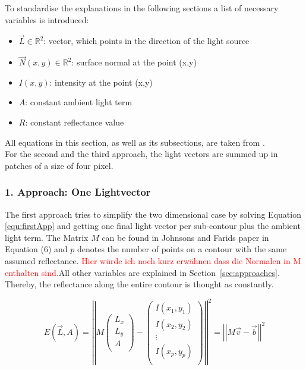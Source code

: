 To standardise the explanations in the following sections a list of necessary variables is introduced: 
\begin{itemize}
\item $\vec{L} \in \mathbb{R}^2$: vector, which points in the direction of the light source 
\item $\vec{N}(x,y)\in \mathbb{R}^2$: surface normal at the point (x,y) 
\item $I(x,y)$: intensity at the point (x,y)
\item $A$: constant ambient light term
\item $R$: constant reflectance value
\end{itemize}
All equations in this section, as well as its subsections, are taken from \cite{Johnson}. \\
For the second and the third approach, the light vectors are summed up in patches of a size of four pixel. 

\subsubsection{1. Approach: One Lightvector}\label{sec:appOne}

The first approach tries to simplify the two dimensional case by solving Equation \ref{equ:firstApp} and getting one final light vector per sub-contour plus the ambient light term. The Matrix $M$ can be found in Johnsons and Farids paper \cite{Johnson} in Equation (6) and $p$ denotes the number of points on a contour with the same assumed reflectance. \textcolor{red}{Hier würde ich noch kurz erwähnen dass die Normalen in M enthalten sind.}All other variables are explained in Section~\ref{sec:approaches}. Thereby, the reflectance along the entire contour is thought as constantly. 

\begin{equation}
\label{equ:firstApp}
E(\vec{L} , A) = 
\left\vert \left\vert 
M
\begin{pmatrix}
L_{x} \\
L_{y} \\
A \\
\end{pmatrix} -
\begin{pmatrix}
I(x_{1} , y_{1}) \\
I(x_{2} , y_{2}) \\
\vdots \\
I(x_{p} , y_{p}) \\
\end{pmatrix}
 \right\vert\right\vert^{2}
 = \left\vert \left\vert  M\vec{v}-\vec{b}  \right\vert\right\vert^{2}
\end{equation}

